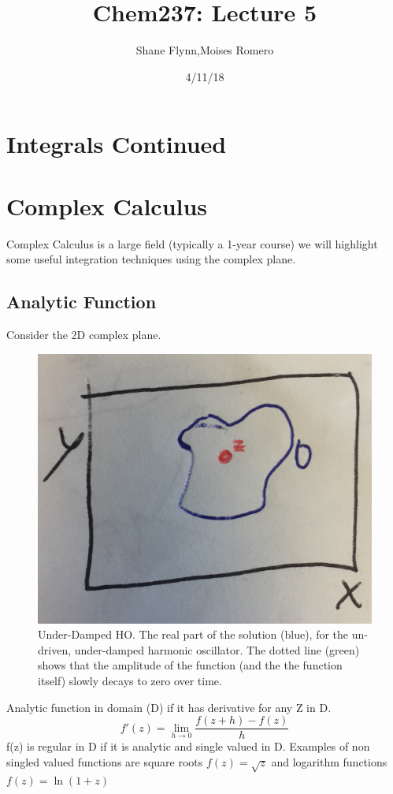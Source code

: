 \documentclass{article}
\title{Chem237: Lecture 5}
\date{4/11/18}
\author{Shane Flynn,Moises Romero}
\newcommand{\be}{\begin{equation}}
\newcommand{\ee}{\end{equation}}
\begin{document}
\maketitle
\section*{Integrals Continued}
\section*{Complex Calculus }
Complex Calculus is a large field (typically a 1-year course) we will highlight some useful integration techniques using the complex plane. 

\subsection*{Analytic Function}
Consider the 2D complex plane. 
\begin{figure}[h]
  \centering
  \includegraphics[scale=0.2]{Figures/complex.png}
    \caption{Under-Damped HO. The real part of the solution (blue), for the un-driven, under-damped harmonic oscillator.
    The dotted line (green) shows that the amplitude of the function (and the the function itself) slowly decays to zero over time.}
  \label{fig:under_damped}
\end{figure}
Analytic function in domain (D) if it has derivative for any Z in D.
\be
f'(z) = \lim_{h\to 0} \frac{f(z+h)-f(z)}{h}
\ee
f(z) is regular in D if it is analytic and single valued in D.
Examples of non singled valued functions are square roots
$f(z) = \sqrt{z}$ and logarithm functions $f(z)=\ln{(1+z)}$
\end{document}
